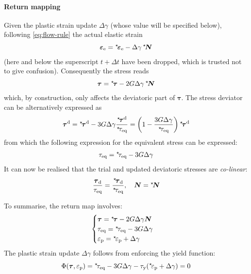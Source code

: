 \documentclass{goose-article}
\newcommand\ST[1]{\hspace*{-.3em}~^\star\!#1}
\newcommand\T[1]{\bm{{#1}}}
\begin{document}
\paragraph{Return mapping}

Given the plastic strain update $\Delta \gamma$ (whose value will be specified below),
following \cref{eq:flow-rule} the actual elastic strain
\begin{equation}
    \T{\varepsilon}_\mathrm{e} = \ST{\T{\varepsilon}}_\mathrm{e} - \Delta \gamma \,\ST{\T{N}}
\end{equation}
(here and below the superscript $t + \Delta t$ have been dropped,
which is trusted not to give confusion).
Consequently the stress reads
\begin{equation}
    \T{\tau} = \ST{\T{\tau}} - 2 G \Delta \gamma \, \ST{\T{N}}
\end{equation}
which, by construction, only affects the deviatoric part of $\T{\tau}$.
The stress deviator can be alternatively expressed as
\begin{equation}
    \T{\tau}^\mathrm{d}
    = \ST{\T{\tau}}^\mathrm{d}
    - 3 G \Delta \gamma \frac{\ST{\T{\tau}}^\mathrm{d}}{\ST{\tau}_\mathrm{eq}}
    = \left( 1 - \frac{3 G \Delta \gamma }{\ST{\tau}_\mathrm{eq}} \right) \ST{\T{\tau}}^\mathrm{d}
\end{equation}
from which the following expression for the equivalent stress can be expressed:
\begin{equation}
    \tau_\mathrm{eq} = \ST{\tau}_\mathrm{eq} - 3 G \Delta \gamma
\end{equation}
It can now be realised that the trial and updated deviatoric stresses are \emph{co-linear}:
\begin{equation}
    \frac{ \T{\tau}_\mathrm{d} }{ \tau_\mathrm{eq} }
    =
    \frac{ \ST{\T{\tau}}_\mathrm{d} }{ \ST{\tau}_\mathrm{eq} }, \quad
    \T{N} = \ST{\T{N}}
\end{equation}

To summarise, the return map involves:
\begin{equation}
    \begin{cases}
        \T{\tau} = \ST{\T{\tau}} - 2 G \Delta \gamma \T{N}
        \\
        \tau_\mathrm{eq} = \ST{\tau}_\mathrm{eq} - 3 G \Delta \gamma
        \\
        \varepsilon_\mathrm{p} = \ST{\varepsilon}_\mathrm{p} + \Delta \gamma
    \end{cases}
\end{equation}
The plastic strain update $\Delta \gamma$ follows from enforcing the yield function:
\begin{equation}
    \Phi(\T{\tau}, \varepsilon_\mathrm{p})
    = \ST{\tau}_\mathrm{eq}
    - 3 G \Delta \gamma - \tau_\mathrm{y} ( \ST{\varepsilon}_\mathrm{p} + \Delta \gamma ) = 0
    \label{eq:return-map:yield-function}
\end{equation}
\end{document}
